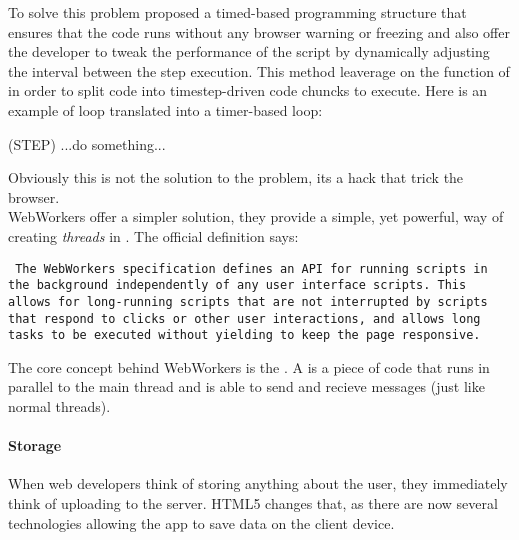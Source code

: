 To solve this problem \cite{jenkin2008parasitic} proposed a timed-based
programming structure that ensures that the code runs without any browser warning
or freezing and also offer the developer to tweak the performance of the script
by dynamically adjusting the interval between the step execution. This method
leaverage on the  function of \js{} in order to split code into
timestep-driven code chuncks to execute. Here is an example of loop translated
into a timer-based loop:
\begin{multicols}{2}
	\begin{algorithm}[H]
	\end{algorithm}

	\vfill
	\columnbreak

	\begin{algorithm}[H]

		\procedure(STEP){
			...do something...\\
		}
	\end{algorithm}
\end{multicols}
Obviously this is not the solution to the problem, its a hack that trick the
browser.\\


WebWorkers offer a simpler solution, they provide a simple, yet powerful, way of
creating \emph{threads} in \js{}. The official definition says:
\begin{quoting}\rm\tt
	The WebWorkers specification defines an API for running scripts in the
	background independently of any user interface scripts.	This allows for
	long-running scripts that are not interrupted by scripts that respond to
	clicks or other user interactions, and allows long tasks to be executed
	without yielding to keep the page responsive.
\end{quoting}

The core concept behind WebWorkers is the . A  is a
piece of \js{} code that runs in parallel to the main thread and is able to send
and recieve messages (just like normal threads).



\paragraph{Storage}
When web developers think of storing anything about the user, they immediately
think of uploading to the server. \ac{HTML}5 changes that, as there are now
several technologies allowing the app to save data on the client device.


